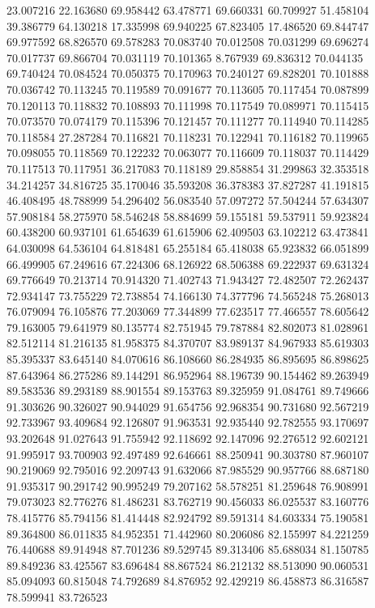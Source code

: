 23.007216
22.163680
69.958442
63.478771
69.660331
60.709927
51.458104
39.386779
64.130218
17.335998
69.940225
67.823405
17.486520
69.844747
69.977592
68.826570
69.578283
70.083740
70.012508
70.031299
69.696274
70.017737
69.866704
70.031119
70.101365
8.767939
69.836312
70.044135
69.740424
70.084524
70.050375
70.170963
70.240127
69.828201
70.101888
70.036742
70.113245
70.119589
70.091677
70.113605
70.117454
70.087899
70.120113
70.118832
70.108893
70.111998
70.117549
70.089971
70.115415
70.073570
70.074179
70.115396
70.121457
70.111277
70.114940
70.114285
70.118584
27.287284
70.116821
70.118231
70.122941
70.116182
70.119965
70.098055
70.118569
70.122232
70.063077
70.116609
70.118037
70.114429
70.117513
70.117951
36.217083
70.118189
29.858854
31.299863
32.353518
34.214257
34.816725
35.170046
35.593208
36.378383
37.827287
41.191815
46.408495
48.788999
54.296402
56.083540
57.097272
57.504244
57.634307
57.908184
58.275970
58.546248
58.884699
59.155181
59.537911
59.923824
60.438200
60.937101
61.654639
61.615906
62.409503
63.102212
63.473841
64.030098
64.536104
64.818481
65.255184
65.418038
65.923832
66.051899
66.499905
67.249616
67.224306
68.126922
68.506388
69.222937
69.631324
69.776649
70.213714
70.914320
71.402743
71.943427
72.482507
72.262437
72.934147
73.755229
72.738854
74.166130
74.377796
74.565248
75.268013
76.079094
76.105876
77.203069
77.344899
77.623517
77.466557
78.605642
79.163005
79.641979
80.135774
82.751945
79.787884
82.802073
81.028961
82.512114
81.216135
81.958375
84.370707
83.989137
84.967933
85.619303
85.395337
83.645140
84.070616
86.108660
86.284935
86.895695
86.898625
87.643964
86.275286
89.144291
86.952964
88.196739
90.154462
89.263949
89.583536
89.293189
88.901554
89.153763
89.325959
91.084761
89.749666
91.303626
90.326027
90.944029
91.654756
92.968354
90.731680
92.567219
92.733967
93.409684
92.126807
91.963531
92.935440
92.782555
93.170697
93.202648
91.027643
91.755942
92.118692
92.147096
92.276512
92.602121
91.995917
93.700903
92.497489
92.646661
88.250941
90.303780
87.960107
90.219069
92.795016
92.209743
91.632066
87.985529
90.957766
88.687180
91.935317
90.291742
90.995249
79.207162
58.578251
81.259648
76.908991
79.073023
82.776276
81.486231
83.762719
90.456033
86.025537
83.160776
78.415776
85.794156
81.414448
82.924792
89.591314
84.603334
75.190581
89.364800
86.011835
84.952351
71.442960
80.206086
82.155997
84.221259
76.440688
89.914948
87.701236
89.529745
89.313406
85.688034
81.150785
89.849236
83.425567
83.696484
88.867524
86.212132
88.513090
90.060531
85.094093
60.815048
74.792689
84.876952
92.429219
86.458873
86.316587
78.599941
83.726523
